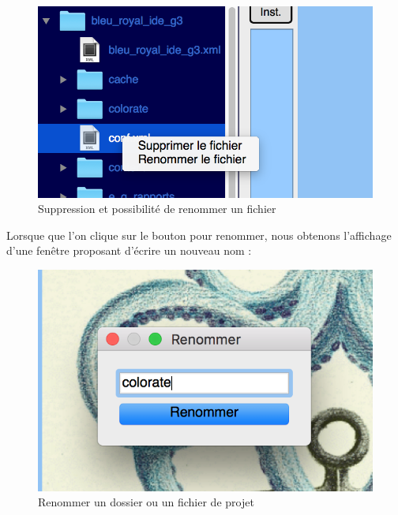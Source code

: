 \documentclass[a4paper,12pt]{article}
\begin{document}
\begin{figure}[h!]
			\begin{center}
				\includegraphics[scale=0.5]{images/imgs_projet/right_click_file.png}
				\caption{Suppression et possibilité de renommer un fichier}
			\end{center}
		\end{figure}

		\newpage
		
Lorsque que l'on clique sur le bouton pour renommer, nous obtenons l'affichage d'une fenêtre proposant d'écrire un nouveau nom :


\begin{figure}[h!]
			\begin{center}
				\includegraphics[scale=0.5]{images/imgs_projet/rename.png}
				\caption{Renommer un dossier ou un fichier de projet}
			\end{center}
		\end{figure}
		
\end{document}
